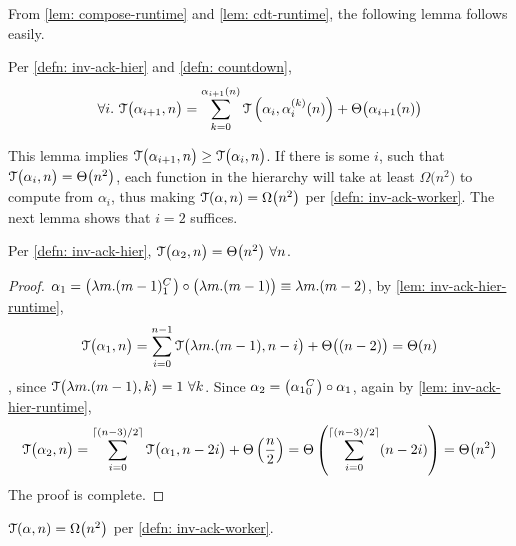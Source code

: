 From \cref{lem: compose-runtime} and \cref{lem: cdt-runtime}, the following lemma follows easily.
\begin{lem} \label{lem: inv-ack-hier-runtime}
	Per \cref{defn: inv-ack-hier} and \cref{defn: countdown}, 
	\begin{equation*}
	\forall i.~\mathcal{T}\big(\alpha_{i+1}, n\big) = \sum_{k=0}^{\alpha_{i+1}(n)}\mathcal{T}\left(\alpha_i, \alpha_i^{(k)}(n)\right) + \Theta\big(\alpha_{i+1}(n)\big)
	\end{equation*}
\end{lem}
This lemma implies $\mathcal{T}\big(\alpha_{i+1}, n\big) \ge \mathcal{T}\big(\alpha_i, n\big)$. If there is some $i$, such that $\mathcal{T}\big(\alpha_i, n\big) = \Theta\big(n^2\big)$, each function in the hierarchy will take at least $\Omega\big(n^2\big)$ to compute from $\alpha_i$, thus making $\mathcal{T}(\alpha, n) = \Omega\big(n^2\big)$ per \cref{defn: inv-ack-worker}. The next lemma shows that $i = 2$ suffices.
\begin{lem}
	Per \cref{defn: inv-ack-hier}, $\mathcal{T}\big(\alpha_2, n\big) = \Theta\big(n^2\big) \ \forall n$. 
\end{lem}
\begin{proof}
	$\alpha_1 = \big(\cdt{\lambda m.(m-1)}{1}\big)\circ \big(\lambda m.(m-1)\big) \equiv \lambda m.(m - 2)$, by \cref{lem: inv-ack-hier-runtime},
	\begin{equation*}
	\mathcal{T}\big(\alpha_1, n\big) = \sum_{i=0}^{n-1} \mathcal{T}\big(\lambda m.(m-1), n - i\big) + \Theta\big((n-2)\big) = \Theta(n)
	\end{equation*}
	, since $\mathcal{T}\big(\lambda m.(m-1), k\big) = 1 \ \forall k$. Since $\alpha_2 = \big(\cdt{\alpha_1}{0}\big)\circ \alpha_1 $, again by \cref{lem: inv-ack-hier-runtime},
	\begin{equation*}
	\mathcal{T}\big(\alpha_2, n\big)
	= \sum_{i=0}^{\lceil (n-3)/2 \rceil} \mathcal{T} \big(\alpha_1, n-2i\big) + \Theta\left(\frac{n}{2}\right)
	= \Theta\left( \sum_{i=0}^{\lceil (n-3)/2 \rceil}(n - 2i) \right)
	= \Theta\big(n^2\big)
	\end{equation*}
	The proof is complete.
\end{proof}
\begin{col}
	$\mathcal{T}(\alpha, n) = \Omega\big(n^2\big)$ per \cref{defn: inv-ack-worker}.
\end{col}

